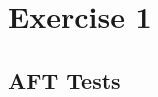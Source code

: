 \documentclass[fleqn,12pt]{scrartcl}
\newcommand{\blattn}{Exercise 1}
\begin{document}
\section*{\blattn}
\setcounter{section}{1}




\subsection{AFT Tests}
\end{document}
